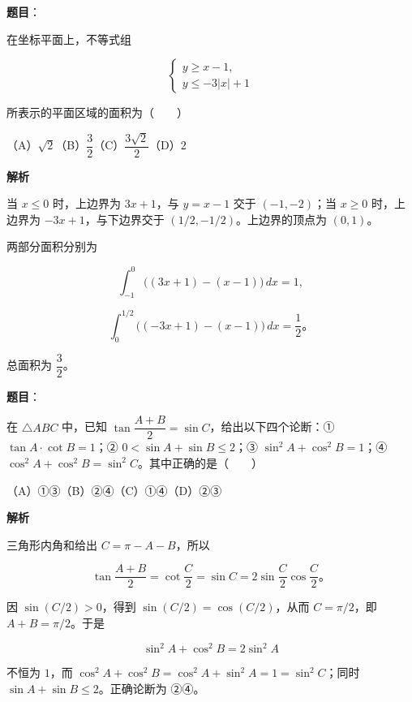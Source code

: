 \begin{answer}

\textbf{题目}：

在坐标平面上，不等式组

\nopagebreak[4]
\[
\begin{cases}
y\geqslant x-1,\\
y\leqslant-3|x|+1
\end{cases}
\]

所表示的平面区域的面积为\mbox{（　　）}

（A）$\sqrt2$\quad（B）$\dfrac32$\quad（C）$\dfrac{3\sqrt2}{2}$\quad（D）$2$

\textbf{解析}

当 $x\leqslant0$ 时，上边界为 $3x+1$，与 $y=x-1$ 交于 $(-1,-2)$；当 $x\geqslant0$ 时，上边界为 $-3x+1$，与下边界交于 $(1/2,-1/2)$。上边界的顶点为 $(0,1)$。

两部分面积分别为

\nopagebreak[4]
\[
\int_{-1}^{0}\bigl((3x+1)-(x-1)\bigr)\,dx=1,
\]

\nopagebreak[4]
\[
\int_0^{1/2}\bigl((-3x+1)-(x-1)\bigr)\,dx=\frac12\text{。}
\]

总面积为 $\dfrac32$。


\end{answer}
\begin{answer}

\textbf{题目}：

在 $\triangle ABC$ 中，已知 $\tan\dfrac{A+B}{2}=\sin C$，给出以下四个论断：① $\tan A\cdot\cot B=1$；② $0<\sin A+\sin B\leqslant2$；③ $\sin^2A+\cos^2B=1$；④ $\cos^2A+\cos^2B=\sin^2C$。其中正确的是\mbox{（　　）}

（A）①③\quad（B）②④\quad（C）①④\quad（D）②③

\textbf{解析}

三角形内角和给出 $C=\pi-A-B$，所以

\nopagebreak[4]
\[
\tan\frac{A+B}{2}=\cot\frac C2=\sin C=2\sin\frac C2\cos\frac C2\text{。}
\]

因 $\sin(C/2)>0$，得到 $\sin(C/2)=\cos(C/2)$，从而 $C=\pi/2$，即 $A+B=\pi/2$。于是

\nopagebreak[4]
\[
\sin^2A+\cos^2B=2\sin^2A
\]

不恒为 $1$，而 $\cos^2A+\cos^2B=\cos^2A+\sin^2A=1=\sin^2C$；同时 $\sin A+\sin B\leqslant2$。正确论断为 ②④。


\end{answer}
